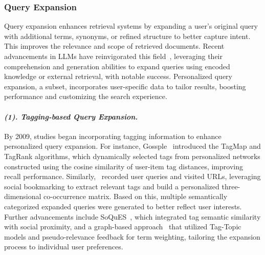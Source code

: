 \subsubsection{\textbf{Query Expansion}}
Query expansion enhances retrieval systems by expanding a user’s original query with additional terms, synonyms, or refined structure to better capture intent. 
This improves the relevance and scope of retrieved documents. Recent advancements in LLMs have reinvigorated this field~\cite{wang2023query2doc,jagerman2023query,jia2024mill}, leveraging their comprehension and generation abilities to expand queries using encoded knowledge or external retrieval, with notable success. Personalized query expansion, a subset, incorporates user-specific data to tailor results, boosting performance and customizing the search experience.


\paragraph{\textbf{\textit{{(1). Tagging-based Query Expansion.}}}}

By 2009, studies began incorporating tagging information to enhance personalized query expansion. For instance, Gossple~\cite{bertier2009toward} introduced the TagMap and TagRank algorithms, which dynamically selected tags from personalized networks constructed using the cosine similarity of user-item tag distances, improving recall performance. Similarly,~\citet{biancalana2009social} recorded user queries and visited URLs, leveraging social bookmarking to extract relevant tags and build a personalized three-dimensional co-occurrence matrix. Based on this, multiple semantically categorized expanded queries were generated to better reflect user interests. Further advancements include SoQuES~\cite{bouadjenek2011personalized}, which integrated tag semantic similarity with social proximity, and a graph-based approach~\cite{zhou2012improving} that utilized Tag-Topic models and pseudo-relevance feedback for term weighting, tailoring the expansion process to individual user preferences.


